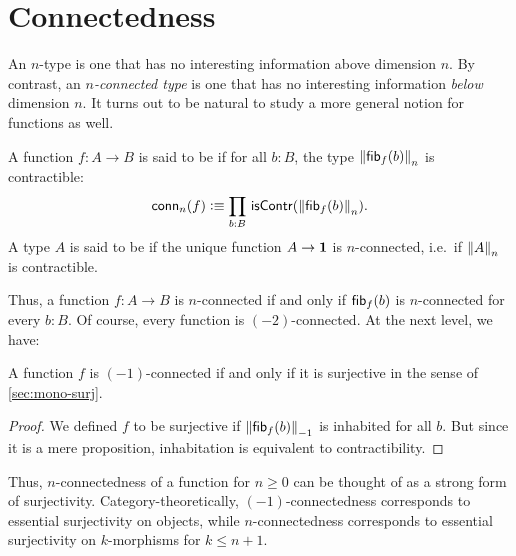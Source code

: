 \section{Connectedness}
\label{sec:connectivity}

An $n$-type is one that has no interesting information above dimension $n$.
By contrast, an \emph{$n$-connected type} is one that has no interesting information \emph{below} dimension $n$.
It turns out to be natural to study a more general notion for functions as well.

\begin{defn}
A function $f:A\to B$ is said to be 
%
%
if for all $b:B$, the type $\trunc n{\hfiber f b}$ is contractible:
\begin{equation*}
  \mathsf{conn}_n(f)\defeq \prd{b:B}\iscontr(\trunc n{\hfiber{f}b}).
\end{equation*}
A type $A$ is said to be 
%
%
 if the unique function $A\to\unit$ is $n$-connected, i.e.\ if $\trunc nA$ is contractible.
\end{defn}

Thus, a function $f:A\to B$ is $n$-connected if and only if $\hfib{f}b$ is $n$-connected for every $b:B$.
Of course, every function is $(-2)$-connected.
At the next level, we have:

\begin{lem}\label{thm:minusoneconn-surjective}
  A function $f$ is $(-1)$-connected if and only if it is surjective in the sense of \cref{sec:mono-surj}.
\end{lem}
\begin{proof}
  We defined $f$ to be surjective if $\trunc{-1}{\hfiber f b}$ is inhabited for all $b$.
  But since it is a mere proposition, inhabitation is equivalent to contractibility.
\end{proof}

Thus, $n$-connectedness of a function for $n\ge 0$ can be thought of as a strong form of surjectivity.
Category-theoretically, $(-1)$-connectedness corresponds to essential surjectivity on objects, while $n$-connectedness corresponds to essential surjectivity on $k$-morphisms for $k\le n+1$.

